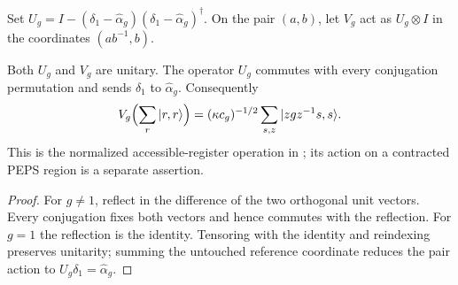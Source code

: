\begin{definition}
    \label{def:peps_regular_flux_creation_matrix}
    \leanok
    Set $U_g=I-(\delta_1-\widehat\alpha_g)(\delta_1-\widehat\alpha_g)^\dagger$.
    On the pair $(a,b)$, let $V_g$ act as $U_g\otimes I$ in the coordinates
    $(ab^{-1},b)$.
\end{definition}

\begin{lemma}
    \label{thm:peps_regular_flux_creation_matrix}
    \leanok
    Both $U_g$ and $V_g$ are unitary. The operator $U_g$ commutes with every
    conjugation permutation and sends $\delta_1$ to $\widehat\alpha_g$.
    Consequently
    \begin{align}
        V_g\Bigl(\sum_r|r,r\rangle\Bigr)
        =(\kappa c_g)^{-1/2}\sum_{s,z}|zgz^{-1}s,s\rangle.
    \end{align}
    This is the normalized accessible-register operation in
    \cite[Theorem 6.17]{Schuch2010PEPS}; its action on a contracted PEPS
    region is a separate assertion.
\end{lemma}
\begin{proof}\leanok
    For $g\ne1$, reflect in the difference of the two orthogonal unit vectors.
    Every conjugation fixes both vectors and hence commutes with the reflection.
    For $g=1$ the reflection is the identity. Tensoring with the identity and
    reindexing preserves unitarity; summing the untouched reference coordinate
    reduces the pair action to $U_g\delta_1=\widehat\alpha_g$.
\end{proof}
